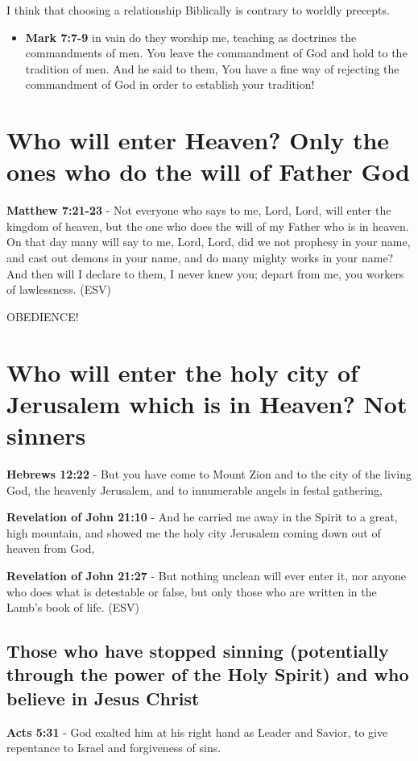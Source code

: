 \documentclass[11pt]{article}
\begin{document}
I think that choosing a relationship Biblically is contrary to worldly precepts.

\begin{itemize}
\item \textbf{Mark 7:7-9} in vain do they worship me, teaching as doctrines the commandments of men.  You leave the commandment of God and hold to the tradition of men.  And he said to them, You have a fine way of rejecting the commandment of God in order to establish your tradition!
\end{itemize}

\section{Who will enter Heaven? Only the ones who do the will of Father God}
\label{sec:orgcca2569}
\textbf{Matthew 7:21-23} - Not everyone who says to me, Lord, Lord, will enter the kingdom of heaven, but the one who does the will of my Father who is in heaven. On that day many will say to me, Lord, Lord, did we not prophesy in your name, and cast out demons in your name, and do many mighty works in your name? And then will I declare to them, I never knew you; depart from me, you workers of lawlessness. (ESV)

OBEDIENCE!

\section{Who will enter the holy city of Jerusalem which is in Heaven? Not sinners}
\label{sec:org37f2310}
\textbf{Hebrews 12:22} - But you have come to Mount Zion and to the city of the living God, the heavenly Jerusalem, and to innumerable angels in festal gathering,

\textbf{Revelation of John 21:10} - And he carried me away in the Spirit to a great, high mountain, and showed me the holy city Jerusalem coming down out of heaven from God,

\textbf{Revelation of John 21:27} -  But nothing unclean will ever enter it, nor anyone who does what is detestable or false, but only those who are written in the Lamb's book of life.  (ESV)

\subsection{Those who have stopped sinning (potentially through the power of the Holy Spirit) and who believe in Jesus Christ}
\label{sec:org1b34a6f}
\textbf{Acts 5:31} - God exalted him at his right hand as Leader and Savior, to give repentance to Israel and forgiveness of sins.
\end{document}

